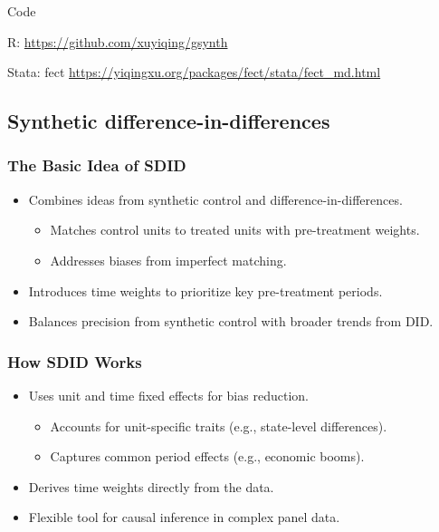 \documentclass{beamer}
\begin{document}
\begin{frame}{Code}

R: \url{https://github.com/xuyiqing/gsynth}

\bigskip

Stata: fect \url{https://yiqingxu.org/packages/fect/stata/fect_md.html}

\end{frame}





\subsection{Synthetic difference-in-differences}

\begin{frame}
\frametitle{The Basic Idea of SDID}

\begin{itemize}
    \item Combines ideas from synthetic control and difference-in-differences.
        \begin{itemize}
            \item Matches control units to treated units with pre-treatment weights.
            \item Addresses biases from imperfect matching.
        \end{itemize}
    \item Introduces time weights to prioritize key pre-treatment periods.
    \item Balances precision from synthetic control with broader trends from DID.
\end{itemize}

\end{frame}

\begin{frame}
\frametitle{How SDID Works}

\begin{itemize}
    \item Uses unit and time fixed effects for bias reduction.
        \begin{itemize}
            \item Accounts for unit-specific traits (e.g., state-level differences).
            \item Captures common period effects (e.g., economic booms).
        \end{itemize}
    \item Derives time weights directly from the data.
    \item Flexible tool for causal inference in complex panel data.
\end{itemize}

\end{frame}
\end{document}
